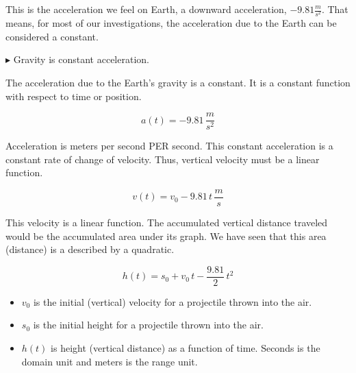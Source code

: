 \documentclass{ximera}
\begin{document}
This is the acceleration we feel on Earth, a downward acceleration, $-9.81 \frac{m}{s^2}$.   That means, for most of our investigations, the acceleration due to the Earth can be considered a constant.




$\blacktriangleright$ Gravity is constant acceleration.

The acceleration due to the Earth's gravity is a constant.  It is a constant function with respect to time or position.


\[ a(t) = -9.81 \, \frac{m}{s^2}  \]



Acceleration is meters per second PER second.  This constant acceleration is a constant rate of change of velocity.  Thus, vertical velocity must be a linear function.




\[ v(t) = v_0 - 9.81 \, t  \, \frac{m}{s}\]



This velocity is a linear function. The accumulated vertical distance traveled would be the accumulated area under its graph. We have seen that this area (distance) is a described by a quadratic. 




\[ h(t) = s_0 + v_0 \, t - \frac{9.81}{2} \, t^2  \]




\begin{itemize}
\item $v_0$ is the initial (vertical) velocity for a projectile thrown into the air. \\

\item $s_0$ is the initial height for a projectile thrown into the air. \\

\item $h(t)$ is height (vertical distance) as a function of time.  Seconds is the domain unit and meters is the range unit.
\end{itemize}
\end{document}
